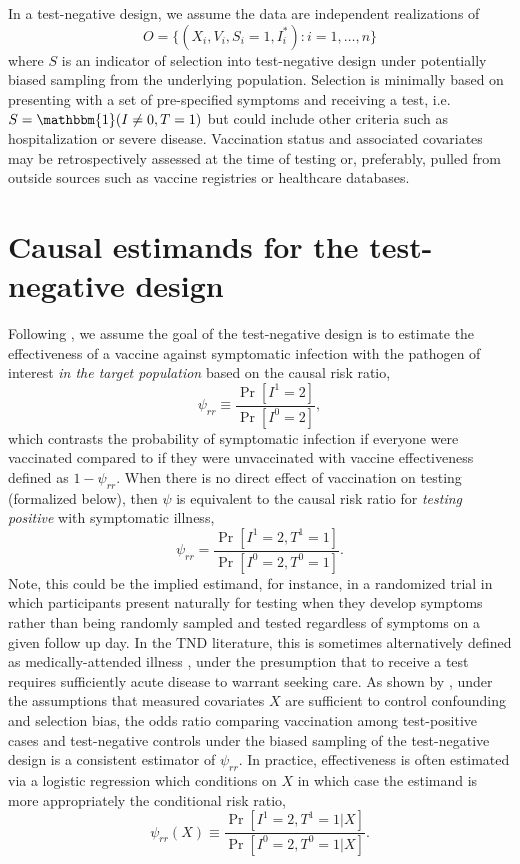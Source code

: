 \documentclass[11pt]{article}
\begin{document}
In a test-negative design, we assume the data are independent realizations of 
$$O = \{(X_i, V_i, S_i = 1, I^*_i) : i = 1, \ldots, n\}$$
where $S$ is an indicator of selection into test-negative design under potentially biased sampling from the underlying population. Selection is minimally based on presenting with a set of pre-specified symptoms and receiving a test, i.e. $S = \mathbbm{1}(I \neq 0, T = 1)$ but could include other criteria such as hospitalization or severe disease. Vaccination status and associated covariates may be retrospectively assessed at the time of testing or, preferably, pulled from outside sources such as vaccine registries or healthcare databases. 

\section{Causal estimands for the test-negative design} \label{sec:estimands}
Following  \cite{schnitzer_estimands_2022}, we assume the goal of the test-negative design is to estimate the effectiveness of a vaccine against symptomatic infection with the pathogen of interest \textit{in the target population} based on the causal risk ratio,
\begin{equation*}
    \psi_{rr} \equiv \dfrac{\Pr[I^1 = 2]}{\Pr[I^0 = 2]},
\end{equation*}
which contrasts the probability of symptomatic infection if everyone were vaccinated compared to if they were unvaccinated with vaccine effectiveness defined as $1 - \psi_{rr}$. When there is no direct effect of vaccination on testing (formalized below), then $\psi$ is equivalent to the causal risk ratio for \textit{testing positive} with symptomatic illness,
\begin{equation*}
    \psi_{rr} = \dfrac{\Pr[I^1 = 2, T^1 = 1]}{\Pr[I^0 = 2, T^0 = 1]}.
\end{equation*}
Note, this could be the implied estimand, for instance, in a randomized trial in which participants present naturally for testing when they develop symptoms rather than being randomly sampled and tested regardless of symptoms on a given follow up day. In the TND literature, this is sometimes alternatively defined as medically-attended illness \cite{jackson_test-negative_2013}, under the presumption that to receive a test requires sufficiently acute disease to warrant seeking care. As shown by , under the assumptions that measured covariates $X$ are sufficient to control confounding and selection bias, the odds ratio comparing vaccination among test-positive cases and test-negative controls under the biased sampling of the test-negative design is a consistent estimator of $\psi_{rr}$. In practice, effectiveness is often estimated via a logistic regression which conditions on $X$ in which case the estimand is more appropriately the conditional risk ratio,
\begin{equation*}
    \psi_{rr}(X) \equiv \dfrac{\Pr[I^1 = 2, T^1 = 1 | X]}{\Pr[I^0 = 2, T^0 = 1 | X]}.
\end{equation*}
\end{document}
